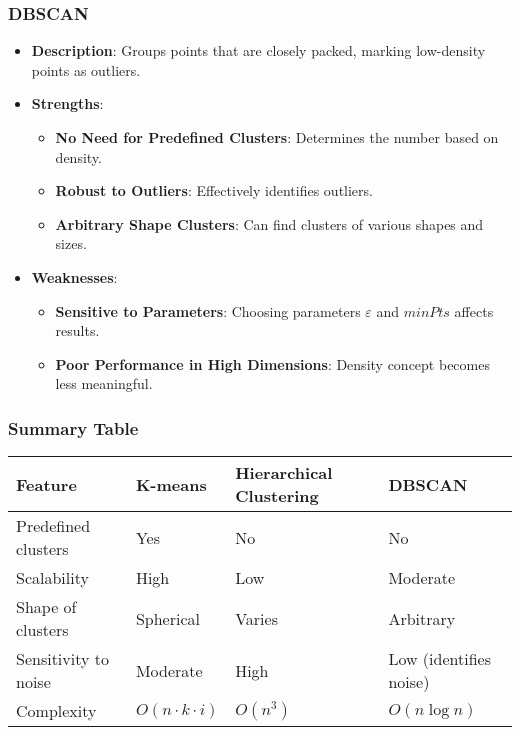 \documentclass[aspectratio=169]{beamer}
\begin{document}
\begin{frame}[fragile]
    \frametitle{DBSCAN}
    \begin{itemize}
        \item \textbf{Description}: Groups points that are closely packed, marking low-density points as outliers.
        \item \textbf{Strengths}:
        \begin{itemize}
            \item \textbf{No Need for Predefined Clusters}: Determines the number based on density.
            \item \textbf{Robust to Outliers}: Effectively identifies outliers.
            \item \textbf{Arbitrary Shape Clusters}: Can find clusters of various shapes and sizes.
        \end{itemize}
        \item \textbf{Weaknesses}:
        \begin{itemize}
            \item \textbf{Sensitive to Parameters}: Choosing parameters \( \varepsilon \) and \( minPts \) affects results.
            \item \textbf{Poor Performance in High Dimensions}: Density concept becomes less meaningful.
        \end{itemize}
    \end{itemize}
\end{frame}

\begin{frame}[fragile]
    \frametitle{Summary Table}
    \begin{center}
        \begin{tabular}{|l|l|l|l|}
            \hline
            \textbf{Feature} & \textbf{K-means} & \textbf{Hierarchical Clustering} & \textbf{DBSCAN} \\
            \hline
            Predefined clusters & Yes & No & No \\
            Scalability & High & Low & Moderate \\
            Shape of clusters & Spherical & Varies & Arbitrary \\
            Sensitivity to noise & Moderate & High & Low (identifies noise) \\
            Complexity & \(O(n \cdot k \cdot i)\) & \(O(n^3)\) & \(O(n \log n)\) \\
            \hline
        \end{tabular}
    \end{center}
\end{frame}
\end{document}
